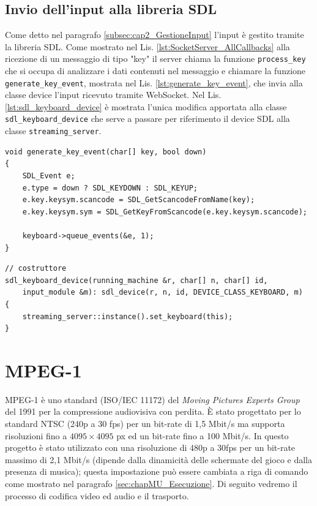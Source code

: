 \subsection{Invio dell'input alla libreria SDL}
Come detto nel paragrafo \ref{subsec:cap2_GestioneInput} l'input è gestito tramite la libreria SDL. Come mostrato nel Lis. \ref{lst:SocketServer_AllCallbacks} alla ricezione di un messaggio di tipo "key" il server chiama la funzione \verb|process_key| che si occupa di analizzare i dati contenuti nel messaggio e chiamare la funzione \verb|generate_key_event|, mostrata nel Lis. \ref{lst:generate_key_event}, che invia alla classe device l'input ricevuto tramite WebSocket. Nel Lis. \ref{lst:sdl_keyboard_device} è mostrata l'unica modifica apportata alla classe \verb|sdl_keyboard_device| che serve a passare per riferimento il device SDL alla classe \verb|streaming_server|.

\begin{lstlisting}[caption=Codice relativo alla gestione input lato server: modulo server. File: \detokenize{lib/util/streaming_server.hpp}, label={lst:generate_key_event}]
void generate_key_event(char[] key, bool down)
{
	SDL_Event e;
	e.type = down ? SDL_KEYDOWN : SDL_KEYUP;
	e.key.keysym.scancode = SDL_GetScancodeFromName(key);
	e.key.keysym.sym = SDL_GetKeyFromScancode(e.key.keysym.scancode);

	keyboard->queue_events(&e, 1);
}
\end{lstlisting}

\begin{lstlisting}[caption=Codice relativo alla gestione input lato server: modulo SDL. File: \detokenize{osd/modules/input/input_sdl.cpp}, label={lst:sdl_keyboard_device}]
// costruttore
sdl_keyboard_device(running_machine &r, char[] n, char[] id,
	input_module &m): sdl_device(r, n, id, DEVICE_CLASS_KEYBOARD, m)
{
	streaming_server::instance().set_keyboard(this);
}
\end{lstlisting}




\section{MPEG-1} \label{sec:cap3_MPEG}
MPEG-1 è uno standard (ISO/IEC 11172) del \textit{Moving Pictures Experts Group} del 1991 per la compressione audiovisiva con perdita. È stato progettato per lo standard NTSC (240p a 30 fps) per un bit-rate di 1,5 Mbit/s ma supporta risoluzioni fino a $4095\times4095$ px ed un bit-rate fino a 100 Mbit/s. In questo progetto è stato utilizzato con una risoluzione di 480p a 30fps per un bit-rate massimo di 2,1 Mbit/s (dipende dalla dinamicità delle schermate del gioco e dalla presenza di musica); questa impostazione può essere cambiata a riga di comando come mostrato nel paragrafo \ref{sec:chapMU_Esecuzione}. Di seguito vedremo il processo di codifica video ed audio e il trasporto.



